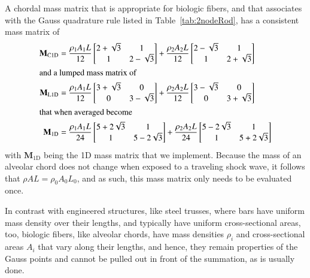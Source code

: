 A chordal mass matrix that is appropriate for biologic fibers, and that associates with the Gauss quadrature rule listed in Table~\ref{tab:2nodeRod}, has a consistent mass matrix of
\begin{subequations}
    \label{massMatrices1D}
    \begin{align}
    \mathbf{M}_{\mathrm{C1D}} & = \frac{\rho_1 A_1 L}{12} 
    \begin{bmatrix} 2 + \sqrt{3} & 1 \\ 
    1 & 2 - \sqrt{3} \end{bmatrix} + \frac{\rho_2 A_2 L}{12} 
    \begin{bmatrix} 2 - \sqrt{3} & 1 \\ 
    1 & 2 + \sqrt{3} \end{bmatrix} \\
    \intertext{and a lumped mass matrix of}
    \mathbf{M}_{\mathrm{L1D}} & = \frac{\rho_1 A_1 L}{12} 
    \begin{bmatrix} 3 + \sqrt{3} & 0 \\
    0 & 3 - \sqrt{3} \end{bmatrix} + \frac{\rho_2 A_2 L}{12} 
    \begin{bmatrix} 3 - \sqrt{3} & 0 \\ 
    0 & 3 + \sqrt{3} \end{bmatrix} \\
    \intertext{that when averaged become}
    \mathbf{M}_{\mathrm{1D}} & = \frac{\rho_1 A_1 L}{24} 
    \begin{bmatrix} 5 + 2\sqrt{3} & 1 \\ 1 & 5 - 2\sqrt{3} \end{bmatrix} +
    \frac{\rho_2 A_2 L}{24} 
    \begin{bmatrix} 5 - 2\sqrt{3} & 1 \\ 1 & 5 + 2\sqrt{3} \end{bmatrix}
    \end{align}
\end{subequations}
with $\mathbf{M}_{\mathrm{1D}}$ being the 1D mass matrix that we implement.  Because the mass of an alveolar chord does not change when exposed to a traveling shock wave, it follows that $\rho A L = \rho_0 A_0 L_0$, and as such, this mass matrix only needs to be evaluated once. 

In contrast with engineered structures, like steel trusses, where bars have uniform mass density over their lengths, and typically have uniform cross-sectional areas, too, biologic fibers, like alveolar chords, have mass densities $\rho_i$ and cross-sectional areas $A_i$ that vary along their lengths, and hence, they remain properties of the Gauss points and cannot be pulled out in front of the summation, as is usually done.  

